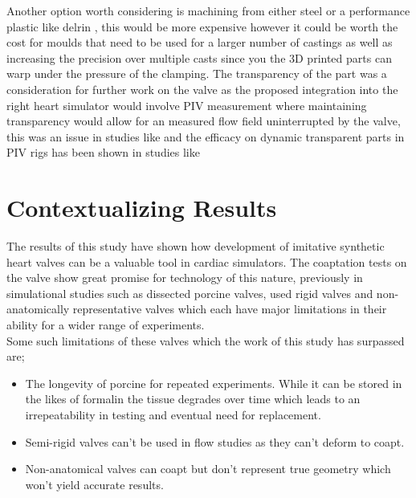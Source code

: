 Another option worth considering is machining from either steel or a performance plastic like delrin , this would be more expensive however it could be worth the cost for moulds that need to be used for a larger number of castings as well as increasing the precision over multiple casts since you the 3D printed parts can warp under the pressure of the clamping. The transparency of the part was a consideration for further work on the valve as the proposed integration into the right heart simulator would involve \gls{PIV} measurement where maintaining transparency would allow for an measured flow field uninterrupted by the valve, this was an issue in studies like  and the efficacy on dynamic transparent parts in \gls{PIV} rigs has been shown in studies like 

\section{Contextualizing Results}


The results of this study have shown how development of imitative synthetic heart valves can be a valuable tool in cardiac simulators. The coaptation tests on the valve show great promise for technology of this nature, previously in simulational studies such as  dissected porcine valves,  used rigid valves and  non-anatomically representative valves which each have major limitations in their ability for a wider range of experiments.\\
Some such limitations of these valves which the work of this study has surpassed are;
\begin{itemize}
    \item The longevity of porcine for repeated experiments. While it can be stored in the likes of formalin the tissue degrades over time which leads to an irrepeatability in testing and eventual need for replacement.
    \item Semi-rigid valves can't be used in flow studies as they can't deform to coapt.
    \item Non-anatomical valves can coapt but don't represent true geometry which won't yield accurate results.
\end{itemize}

